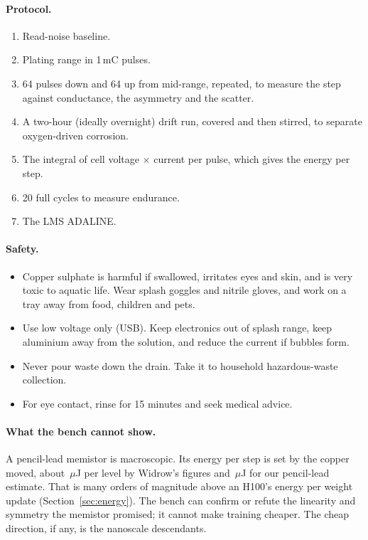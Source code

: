\paragraph{Protocol.}
\begin{enumerate}
\item Read-noise baseline.
\item Plating range in 1\,mC pulses.
\item 64 pulses down and 64 up from mid-range, repeated, to measure the step against conductance, the asymmetry and the scatter.
\item A two-hour (ideally overnight) drift run, covered and then stirred, to separate oxygen-driven corrosion.
\item The integral of cell voltage $\times$ current per pulse, which gives the energy per step.
\item 20 full cycles to measure endurance.
\item The LMS ADALINE.
\end{enumerate}

\paragraph{Safety.}
\begin{itemize}
\item Copper sulphate is harmful if swallowed, irritates eyes and skin, and is very toxic to aquatic life. Wear splash goggles
      and nitrile gloves, and work on a tray away from food, children and pets.
\item Use low voltage only (USB). Keep electronics out of splash range, keep aluminium away from the solution, and reduce the
      current if bubbles form.
\item Never pour waste down the drain. Take it to household hazardous-waste collection.
\item For eye contact, rinse for 15 minutes and seek medical advice.
\end{itemize}

\paragraph{What the bench cannot show.} A pencil-lead memistor is macroscopic. Its energy per step is set by the copper moved,
about \RWidrowLevelUJ{}\,$\mu$J per level by Widrow's figures and \RPencilLevelUJ{}\,$\mu$J for our pencil-lead estimate. That is
many orders of magnitude above an H100's energy per weight update (Section~\ref{sec:energy}). The bench can confirm or refute
the linearity and symmetry the memistor promised; it cannot make training cheaper. The cheap direction, if any, is the nanoscale
descendants.
